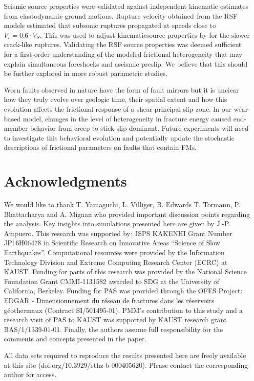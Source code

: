 \documentclass[preprint,1p, 10pt,authoryear]{elsarticle}
\begin{document}
Seismic source properties were validated against independent kinematic estimates from elastodynamic ground motions. Rupture velocity obtained from the RSF models estimated that subsonic ruptures propagated at speeds close to $V_r = 0.6\cdot V_{S}$.  This was used to adjust kinematicsource properties by \citet{Selvadurai2019} for the slower crack-like ruptures. Validating the RSF source properties was deemed sufficient for a first-order understanding of the modeled frictional heterogeneity that may explain simultaneous foreshocks and aseismic preslip. We believe that this should be further explored in more robust parametric studies. 

Worn faults observed in nature have the form of fault mirrors but it is unclear how they truly evolve over geologic time, their spatial extent and how this evolution affects the frictional response of a shear principal slip zone. In our wear-based model, changes in the level of heterogeneity in fracture energy caused end-member behavior from creep to stick-slip dominant. Future experiments will need to investigate this behavioral evolution and potentially update the stochastic descriptions of frictional parameters on faults that contain FMs. 

\section*{Acknowledgments}
We would like to thank T. Yamaguchi, L. Villiger, B. Edwards T. Tormann, P. Bhattacharya and A. Mignan who provided important discussion points regarding the analysis. Key insights into simulations presented here are given by J.-P. Ampuero. This research was supported by: JSPS KAKENHI Grant Number JP16H06478 in Scientific Research on Innovative Areas ``Science of Slow Earthquakes''. Computational resources were provided by the Information Technology Division and Extreme Computing Research Center (ECRC) at KAUST. Funding for parts of this research was provided by the National Science Foundation Grant CMMI‐1131582 awarded to SDG at the University of California, Berkeley. Funding for PAS was provided through the OFES Project: EDGAR ‐ Dimensionnement du réseau de fractures dans les réservoirs géothermaux (Contract SI/501495‐01). PMM's contribution to this study and a research visit of PAS to KAUST was supported by KAUST research grant BAS/1/1339-01-01. Finally, the authors assume full responsibility for the comments and concepts presented in the paper.

All data sets required to reproduce the results presented here are freely available at this site (doi.org/10.3929/ethz-b-000405620). Please contact the corresponding author for access.

\singlespacing

 

\end{document}
